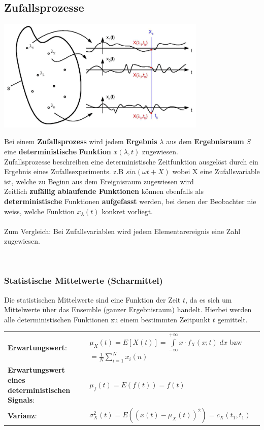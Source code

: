 \subsection{Zufallsprozesse}
\begin{minipage}{10.3cm}
	\includegraphics[width=10cm]{bilder/zufallsprozess.png}
\end{minipage}
\begin{minipage}{8.5cm}
	Bei einem \textbf{Zufallsprozess} wird jedem \textbf{Ergebnis} \boldmath$\lambda$ aus 
	dem \textbf{Ergebnisraum} $S$ eine \textbf{deterministische} \textbf{Funktion} $x(\lambda, t)$
	\unboldmath zugewiesen. \\
	Zufallsprozesse beschreiben eine deterministische Zeitfunktion ausgelöst durch ein Ergebnis eines
	Zufallsexperiments. z.B $sin(\omega t + X)$ wobei X eine Zufallsvariable ist, welche zu Beginn aus dem Ereignisraum zugewiesen wird\\
	Zeitlich \textbf{zufällig ablaufende Funktionen} können ebenfalls als \textbf{deterministische} Funktionen 
	\textbf{aufgefasst} werden, bei denen der Beobachter nie weiss, welche Funktion $x_\lambda(t)$ konkret
	vorliegt.	\\ \\
	Zum Vergleich: Bei Zufallsvariablen wird jedem Elementarereignis eine Zahl zugewiesen. 
\end{minipage} 
\vspace{0.5cm} \\

\subsubsection{Statistische Mittelwerte (Scharmittel)}
Die statistischen Mittelwerte sind eine Funktion der Zeit $t$, da es sich um Mittelwerte über das
Ensemble (ganzer Ergebnisraum) handelt. Hierbei werden alle deterministischen Funktionen zu einem
bestimmten Zeitpunkt $t$ gemittelt. 

\renewcommand{\arraystretch}{1.4}
\begin{tabular}[c]{ p{4.5cm}  p{13.5 cm}  }
	\textbf{Erwartungswert}: 	&  $\mu_{X}(t) = E\left[X(t)\right] =
          \int\limits_{-\infty}^{+\infty} x \cdot f_{X}(x;t)\;dx$ bzw $=\frac{1}{N}\sum\limits_{i=1}^{N}x_i(n)$ \\
    \textbf{Erwartungswert eines deterministischen Signals}:& $\mu_f(t) = E(f(t))=f(t)$\\
 	\textbf{Varianz}: &         $\sigma_X^2(t)=E((x(t)-\mu_X(t))^2)=c_X(t_1,t_1)$
    
	 
\end{tabular}
\renewcommand{\arraystretch}{1}


